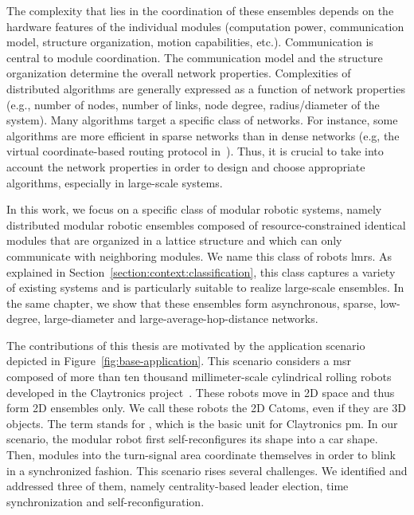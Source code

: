 The complexity that lies in the coordination of these ensembles depends on the hardware features of the individual modules (computation power, communication model, structure organization, motion capabilities, etc.). Communication is central to module coordination. The communication model and the structure organization determine the overall network properties. Complexities of distributed algorithms are generally expressed as a function of network properties (e.g., number of nodes, number of links, node degree, radius/diameter of the system). Many algorithms target a specific class of networks. For instance, some algorithms are more efficient in sparse networks than in dense networks (e.g, the virtual coordinate-based routing protocol in~\cite{zhao2007hop}). Thus, it is crucial to take into account the network properties in order to design and choose appropriate algorithms, especially in large-scale systems.

In this work, we focus on a specific class of modular robotic systems, namely distributed modular robotic ensembles composed of resource-constrained identical modules that are organized in a lattice structure and which can only communicate with neighboring modules. We name this class of robots \acrshort{lmrs}. As explained in Section~\ref{section:context:classification}, this class captures a variety of existing systems and is particularly suitable to realize large-scale ensembles. In the same chapter, we show that these ensembles form asynchronous, sparse, low-degree, large-diameter and large-average-hop-distance networks.

The contributions of this thesis are motivated by the application scenario depicted in Figure~\ref{fig:base-application}. This scenario considers a \gls{msr}~\cite{yim2007modular} composed of more than ten thousand millimeter-scale cylindrical rolling robots developed in the Claytronics project~\cite{karagozler-iros09}. These robots move in 2D space and thus form 2D ensembles only. We call these robots the 2D Catoms, even if they are 3D objects. The term  stands for , which is the basic unit for Claytronics \gls{pm}. In our scenario, the modular robot first self-reconfigures its shape into a car shape. Then, modules into the turn-signal area coordinate themselves in order to blink in a synchronized fashion. This scenario rises several challenges. We identified and addressed three of them, namely centrality-based leader election, time synchronization and self-reconfiguration.

